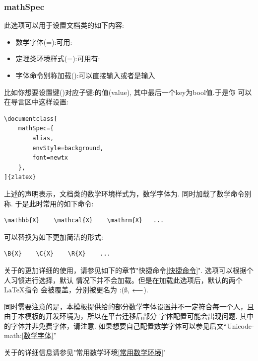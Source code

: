 \subsubsection{mathSpec}
此选项可以用于设置文档类的如下内容:
\begin{itemize}
    \item 数学字体(=):可用:
    \item 定理类环境样式(=):可用有:
    \item 字体命令别称加载():可以直接输入或者是输入
\end{itemize}

比如你想要设置键()对应子键:的值(value), 其中最后一个key为bool值.于是你
可以在导言区中这样设置:

\begin{verbatim}
\documentclass[
    mathSpec={
        alias,
        envStyle=background,  
        font=newtx
    },
]{zlatex}
\end{verbatim}

上述的声明表示，文档类的数学环境样式为，数学字体为. 同时加载了数学命令别称.
于是此时常用的如下命令:
\begin{verbatim}
\mathbb{X}    \mathcal{X}    \mathrm{X}   ...
\end{verbatim}

可以替换为如下更加简洁的形式:
\begin{verbatim}
\B{X}    \C{X}    \R{X}    ...
\end{verbatim}

关于的更加详细的使用，请参见如下的章节"快捷命令\cref{快捷命令}". 选项可以根据个人习惯进行选择，默认
情况下并不会加载。但是在加载此选项后，默认的两个\LaTeX{}指令\cmd{\S, \ll} 会被覆盖，分别被更名为 \cmd{\ss, \LL}:(\ss, $\LL$). 

同时需要注意的是，本模板提供给的部分数学字体设置并不一定符合每一个人，且由于本模板的开发环境为，所以在平台迁移后部分
字体配置可能会出现问题. 其中的字体并非免费字体，请注意. 如果想要自己配置数学字体可以参见后文``Unicode-math:\cref{数学字体}''

\begin{leftbar}
关于的详细信息请参见"常用数学环境\cref{常用数学环境}"
\end{leftbar}

